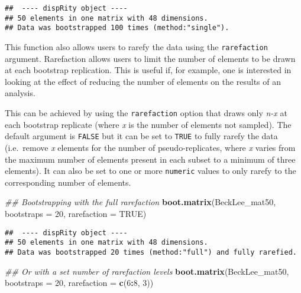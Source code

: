 \documentclass[
]{book}
\newenvironment{Shaded}{\begin{snugshade}}{\end{snugshade}}
\newcommand{\CommentTok}[1]{\textcolor[rgb]{0.56,0.35,0.01}{\textit{#1}}}
\newcommand{\DataTypeTok}[1]{\textcolor[rgb]{0.13,0.29,0.53}{#1}}
\newcommand{\DecValTok}[1]{\textcolor[rgb]{0.00,0.00,0.81}{#1}}
\newcommand{\KeywordTok}[1]{\textcolor[rgb]{0.13,0.29,0.53}{\textbf{#1}}}
\newcommand{\NormalTok}[1]{#1}
\newcommand{\OperatorTok}[1]{\textcolor[rgb]{0.81,0.36,0.00}{\textbf{#1}}}
\newcommand{\OtherTok}[1]{\textcolor[rgb]{0.56,0.35,0.01}{#1}}
\begin{document}
\begin{verbatim}
##  ---- dispRity object ---- 
## 50 elements in one matrix with 48 dimensions.
## Data was bootstrapped 100 times (method:"single").
\end{verbatim}

This function also allows users to rarefy the data using the \texttt{rarefaction} argument.
Rarefaction allows users to limit the number of elements to be drawn at each bootstrap replication.
This is useful if, for example, one is interested in looking at the effect of reducing the number of elements on the results of an analysis.

This can be achieved by using the \texttt{rarefaction} option that draws only \emph{n-x} at each bootstrap replicate (where \emph{x} is the number of elements not sampled).
The default argument is \texttt{FALSE} but it can be set to \texttt{TRUE} to fully rarefy the data (i.e.~remove \emph{x} elements for the number of pseudo-replicates, where \emph{x} varies from the maximum number of elements present in each subset to a minimum of three elements).
It can also be set to one or more \texttt{numeric} values to only rarefy to the corresponding number of elements.

\begin{Shaded}
\begin{Highlighting}[]
\CommentTok{\#\# Bootstrapping with the full rarefaction}
\KeywordTok{boot.matrix}\NormalTok{(BeckLee\_mat50, }\DataTypeTok{bootstraps =} \DecValTok{20}\NormalTok{,}
            \DataTypeTok{rarefaction =} \OtherTok{TRUE}\NormalTok{)}
\end{Highlighting}
\end{Shaded}

\begin{verbatim}
##  ---- dispRity object ---- 
## 50 elements in one matrix with 48 dimensions.
## Data was bootstrapped 20 times (method:"full") and fully rarefied.
\end{verbatim}

\begin{Shaded}
\begin{Highlighting}[]
\CommentTok{\#\# Or with a set number of rarefaction levels}
\KeywordTok{boot.matrix}\NormalTok{(BeckLee\_mat50, }\DataTypeTok{bootstraps =} \DecValTok{20}\NormalTok{,}
            \DataTypeTok{rarefaction =} \KeywordTok{c}\NormalTok{(}\DecValTok{6}\OperatorTok{:}\DecValTok{8}\NormalTok{, }\DecValTok{3}\NormalTok{))}
\end{Highlighting}
\end{Shaded}
\end{document}
